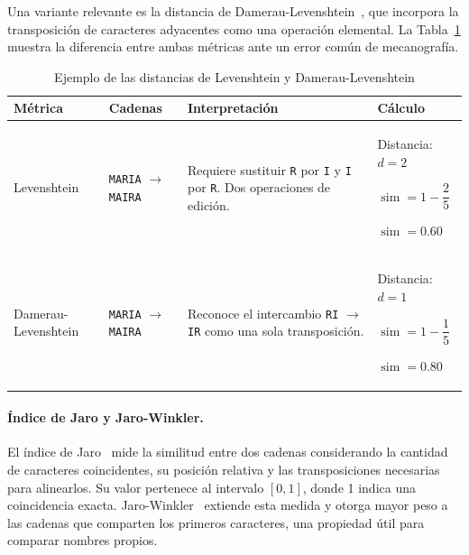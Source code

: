 Una variante relevante es la distancia de Damerau-Levenshtein~\cite{damerau1964}, que incorpora la transposición de caracteres adyacentes como una operación elemental. La Tabla~\ref{tab:ejemplo_distancias_edicion} muestra la diferencia entre ambas métricas ante un error común de mecanografía.

\begin{table}[H]
\centering
\caption{Ejemplo de las distancias de Levenshtein y Damerau-Levenshtein}
\label{tab:ejemplo_distancias_edicion}
\small
\begin{tabular}{>{\raggedright\arraybackslash}p{2.6cm}
                >{\raggedright\arraybackslash}p{2.5cm}
                >{\raggedright\arraybackslash}p{4.5cm}
                >{\raggedright\arraybackslash}p{3.8cm}}
\toprule
\textbf{Métrica} & \textbf{Cadenas} & \textbf{Interpretación} & \textbf{Cálculo} \\
\midrule
Levenshtein
  & \texttt{MARIA} $\rightarrow$ \texttt{MAIRA}
  & Requiere sustituir \texttt{R} por \texttt{I} y \texttt{I} por \texttt{R}. Dos operaciones de edición.
  & Distancia: $d=2$

    \vspace{2pt}
    $\operatorname{sim}=1-\dfrac{2}{5}$

    \vspace{2pt}
    $\operatorname{sim}=0.60$ \\
\addlinespace
Damerau-Levenshtein
  & \texttt{MARIA} $\rightarrow$ \texttt{MAIRA}
  & Reconoce el intercambio \texttt{RI} $\rightarrow$ \texttt{IR} como una sola transposición.
  & Distancia: $d=1$

    \vspace{2pt}
    $\operatorname{sim}=1-\dfrac{1}{5}$

    \vspace{2pt}
    $\operatorname{sim}=0.80$ \\
\bottomrule
\end{tabular}
\end{table}

\paragraph{Índice de Jaro y Jaro-Winkler.}
El índice de Jaro~\cite{jaro1989} mide la similitud entre dos cadenas considerando la cantidad de caracteres coincidentes, su posición relativa y las transposiciones necesarias para alinearlos. Su valor pertenece al intervalo $[0,1]$, donde 1 indica una coincidencia exacta. Jaro-Winkler~\cite{winkler1990} extiende esta medida y otorga mayor peso a las cadenas que comparten los primeros caracteres, una propiedad útil para comparar nombres propios.

